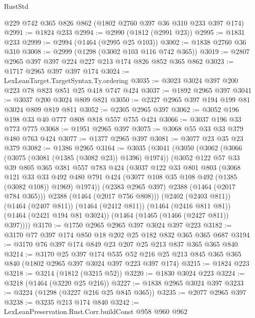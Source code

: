 \begin{lexlean}{RustStd}
\begin{coremodule}
    @229
    @742
    @365
    @826
    @862
    (@1802 @2760 @397 @36 @310 @233 @397 @174)
@2991 := @1824 @233
@2994 := @2990 (@1812 (@2991 @23))
@2995 := @1831 @233
@2999 := @2994 (@1464 (@2995 @25 @103))
@3002 := @1838 @2760 @36 @310
@3008 := @2999 (@1298 (@3002 @103 @116 @742 @365))
@3019 := @2807 @2965 @397 @397 @224 @227 @213 @174 @826 @852 @365 @862
@3023 := @1717 @2965 @397 @397 @174
@3024 := LexLeanTarget.TargetSyntax.Ty.ordering
@3035 := @3023 @3024 @397 @200 @223 @78 @823 @851 @25 @418 @747 @424
@3037 := @1892 @2965 @397
@3041 := @3037 @200 @3024 @809 @821
@3050 := @2327 @2965 @397 @194 @199 @81 @3024 @809 @819 @811
@3052 := @2305 @2965 @397
@3062 := @3052 @196 @198 @33 @40 @777 @808 @818 @557 @755 @424
@3066 := @3037 @196 @33 @773 @775
@3068 := @1951 @2965 @397
@3075 := @3068 @55 @33 @33 @379 @480 @763 @424
@3077 := @1377 @2965 @397
@3081 := @3077 @23 @35 @23 @379
@3082 := @1386 @2965
@3164 := @3035
    (@3041
      (@3050
        (@3062
          (@3066 (@3075 (@3081 (@1385 (@3082 @23)) @1396) @1974))
          (@3052
            @122
            @57
            @33
            @39
            @805
            @365
            @381
            @557
            @783
            @424
            (@3037
              @122
              @33
              @801
              @803
              (@3068
                @121
                @33
                @33
                @492
                @480
                @791
                @424
                (@3077 @108 @35 @108 @492 (@1385 (@3082 @108)) @1969)
                @1974))
            (@2383 @2965 @397)
            @2388
            (@1464 (@2017 @784 @365)))
          @2388
          (@1464 (@2017 @756 @808)))
        (@2402 (@2403 @811))
        (@1464 (@2407 @811))
        (@1464 (@2412 @811))
        (@1464 (@2416 @811 @81))
        (@1464 (@2421 @194 @81 @3024))
        (@1464 (@1465 (@1466 (@2427 @811)) @397))))
@3170 := @1750 @2965 @2965 @397 @3024 @397 @223
@3182 := @3170 @77 @397 @174 @850 @18 @202 @25 @182 @832 @365 @365 @687
@3194 := @3170 @76 @397 @174 @849 @23 @207 @25 @213 @837 @365 @365 @840
@3214 := @3170
    @25
    @397
    @174
    @535
    @52
    @216
    @25
    @213
    @845
    @365
    @365
    @840
    (@1802 @2965 @397 @3024 @397 @223 @397 @174)
@3215 := @1824 @223
@3218 := @3214 (@1812 (@3215 @52))
@3220 := @1830 @3024 @223
@3224 := @3218 (@1464 (@3220 @25 @216))
@3227 := @1838 @2965 @3024 @397
@3233 := @3224 (@1298 (@3227 @216 @25 @845 @365))
@3235 := @2077 @2965 @397
@3238 := @3235 @213 @174 @840
@3242 := LexLeanPreservation.Rust.Corr.buildConst @958 @960 @962

\end{coremodule}
\end{lexlean}
